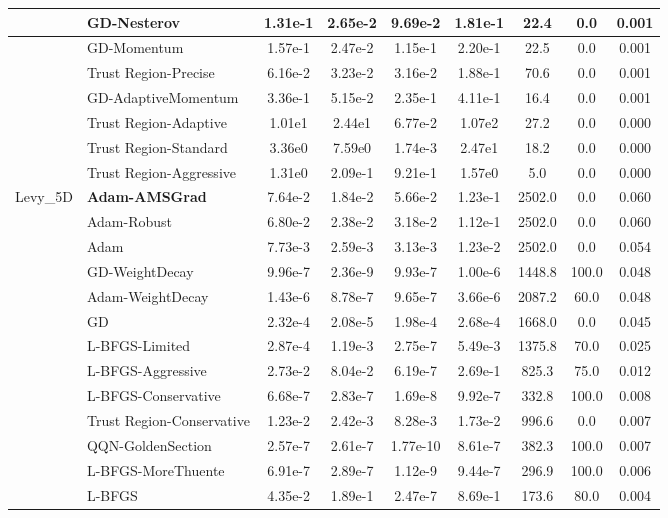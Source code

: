 \documentclass{article}
\begin{document}
\begin{longtable}{|l|l|c|c|c|c|c|c|c|}
\hline
 & GD-Nesterov & 1.31e-1 & 2.65e-2 & 9.69e-2 & 1.81e-1 & 22.4 & 0.0 & 0.001 \\
\hline
 & GD-Momentum & 1.57e-1 & 2.47e-2 & 1.15e-1 & 2.20e-1 & 22.5 & 0.0 & 0.001 \\
\hline
 & Trust Region-Precise & 6.16e-2 & 3.23e-2 & 3.16e-2 & 1.88e-1 & 70.6 & 0.0 & 0.001 \\
\hline
 & GD-AdaptiveMomentum & 3.36e-1 & 5.15e-2 & 2.35e-1 & 4.11e-1 & 16.4 & 0.0 & 0.001 \\
\hline
 & Trust Region-Adaptive & 1.01e1 & 2.44e1 & 6.77e-2 & 1.07e2 & 27.2 & 0.0 & 0.000 \\
\hline
 & Trust Region-Standard & 3.36e0 & 7.59e0 & 1.74e-3 & 2.47e1 & 18.2 & 0.0 & 0.000 \\
\hline
 & Trust Region-Aggressive & 1.31e0 & 2.09e-1 & 9.21e-1 & 1.57e0 & 5.0 & 0.0 & 0.000 \\
Levy\_5D & \textbf{Adam-AMSGrad} & 7.64e-2 & 1.84e-2 & 5.66e-2 & 1.23e-1 & 2502.0 & 0.0 & 0.060 \\
\hline
 & Adam-Robust & 6.80e-2 & 2.38e-2 & 3.18e-2 & 1.12e-1 & 2502.0 & 0.0 & 0.060 \\
\hline
 & Adam & 7.73e-3 & 2.59e-3 & 3.13e-3 & 1.23e-2 & 2502.0 & 0.0 & 0.054 \\
\hline
 & GD-WeightDecay & 9.96e-7 & 2.36e-9 & 9.93e-7 & 1.00e-6 & 1448.8 & 100.0 & 0.048 \\
\hline
 & Adam-WeightDecay & 1.43e-6 & 8.78e-7 & 9.65e-7 & 3.66e-6 & 2087.2 & 60.0 & 0.048 \\
\hline
 & GD & 2.32e-4 & 2.08e-5 & 1.98e-4 & 2.68e-4 & 1668.0 & 0.0 & 0.045 \\
\hline
 & L-BFGS-Limited & 2.87e-4 & 1.19e-3 & 2.75e-7 & 5.49e-3 & 1375.8 & 70.0 & 0.025 \\
\hline
 & L-BFGS-Aggressive & 2.73e-2 & 8.04e-2 & 6.19e-7 & 2.69e-1 & 825.3 & 75.0 & 0.012 \\
\hline
 & L-BFGS-Conservative & 6.68e-7 & 2.83e-7 & 1.69e-8 & 9.92e-7 & 332.8 & 100.0 & 0.008 \\
\hline
 & Trust Region-Conservative & 1.23e-2 & 2.42e-3 & 8.28e-3 & 1.73e-2 & 996.6 & 0.0 & 0.007 \\
\hline
 & QQN-GoldenSection & 2.57e-7 & 2.61e-7 & 1.77e-10 & 8.61e-7 & 382.3 & 100.0 & 0.007 \\
\hline
 & L-BFGS-MoreThuente & 6.91e-7 & 2.89e-7 & 1.12e-9 & 9.44e-7 & 296.9 & 100.0 & 0.006 \\
\hline
 & L-BFGS & 4.35e-2 & 1.89e-1 & 2.47e-7 & 8.69e-1 & 173.6 & 80.0 & 0.004 \\

\end{longtable}
\end{document}
